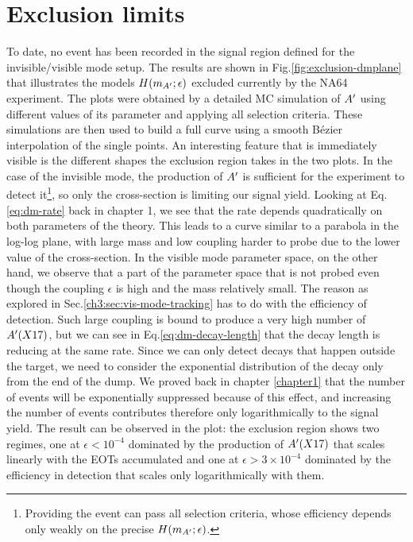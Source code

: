 
\section{Exclusion limits}
\label{ch4:sec:exclusion limits}

To date, no event has been recorded in the signal region defined for the invisible/visible mode setup. The results are shown in Fig.\ref{fig:exclusion-dmplane} that illustrates the models $H(m_{A'};\epsilon)$ excluded currently by the NA64 experiment. The plots were obtained by a detailed MC simulation of $A'$ using different values of its parameter and applying all selection criteria. These simulations are then used to build a full curve using a smooth Bézier interpolation of the single points. An interesting feature that is immediately visible is the different shapes the exclusion region takes in the two plots. In the case of the invisible mode, the production of $A'$ is sufficient for the experiment to detect it\footnote{Providing the event can pass all selection criteria, whose efficiency depends only weakly on the precise $H(m_{A'};\epsilon)$.}, so only the cross-section is limiting our signal yield. Looking at Eq.\ref{eq:dm-rate} back in chapter 1, we see that the rate depends quadratically on both parameters of the theory. This leads to a curve similar to a parabola in the log-log plane, with large mass and low coupling harder to probe due to the lower value of the cross-section. In the visible mode parameter space, on the other hand, we observe that a part of the parameter space that is not probed even though the coupling $\epsilon$ is high and the mass relatively small. The reason as explored in Sec.\ref{ch3:sec:vis-mode-tracking} has to do with the efficiency of detection. Such large coupling is bound to produce a very high number of $A'(X17)$, but we can see in Eq.\ref{eq:dm-decay-length} that the decay length is reducing at the same rate. Since we can only detect decays that happen outside the target, we need to consider the exponential distribution of the decay only from the end of the dump. We proved back in chapter \ref{chapter1} that the number of events will be exponentially suppressed because of this effect, and increasing the number of events contributes therefore only logarithmically to the signal yield. The result can be observed in the plot: the exclusion region shows two regimes, one at $\epsilon < 10^{-4}$ dominated by the production of $A'(X17)$ that scales linearly with the EOTs accumulated and one at $\epsilon > 3 \times 10^{-4}$ dominated by the efficiency in detection that scales only logarithmically with them.

